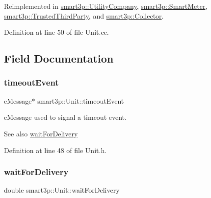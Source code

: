 Reimplemented in \hyperlink{classsmart3p_1_1UtilityCompany_af5ce80d9f1d293c9be21fa65668c0e74}{smart3p\+::\+Utility\+Company}, \hyperlink{classsmart3p_1_1SmartMeter_a3491294618643d423e8fd3578eb3a439}{smart3p\+::\+Smart\+Meter}, \hyperlink{classsmart3p_1_1TrustedThirdParty_adedb95022442b9c7f2bc1de5f4c17a76}{smart3p\+::\+Trusted\+Third\+Party}, and \hyperlink{classsmart3p_1_1Collector_a1b82f1a10a2579c3ed25bc899220b906}{smart3p\+::\+Collector}.



Definition at line 50 of file Unit.\+cc.



\subsection{Field Documentation}
\mbox{\label{classsmart3p_1_1Unit_a48c180587dfed5ccd985f52f4fab6001}} 
\subsubsection{\texorpdfstring{timeout\+Event}{timeoutEvent}}
{\footnotesize\ttfamily c\+Message$\ast$ smart3p\+::\+Unit\+::timeout\+Event\hspace{0.3cm}{\ttfamily [protected]}}

c\+Message used to signal a timeout event. \begin{DoxySeeAlso}{See also}
\hyperlink{classsmart3p_1_1Unit_a227ec26ef4734fb25d0e697ff3952e8a}{wait\+For\+Delivery} 
\end{DoxySeeAlso}


Definition at line 48 of file Unit.\+h.

\mbox{\label{classsmart3p_1_1Unit_a227ec26ef4734fb25d0e697ff3952e8a}} 
\subsubsection{\texorpdfstring{wait\+For\+Delivery}{waitForDelivery}}
{\footnotesize\ttfamily double smart3p\+::\+Unit\+::wait\+For\+Delivery\hspace{0.3cm}{\ttfamily [protected]}}

